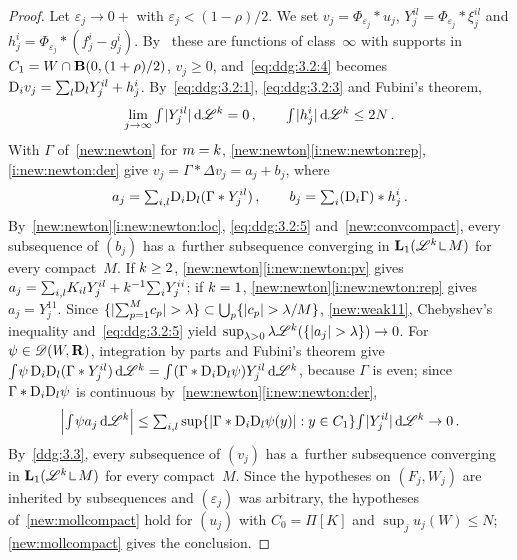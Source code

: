 \documentclass[a4paper,twoside,leqno]{article}
\begin{document}
\begin{proof}
    Let $\varepsilon_j \to 0+$ with $\varepsilon_j < (1 - \rho)/2$. We set $v_j =
    \Phi_{\varepsilon_j} * u_j$, $Y_j^{il} = \Phi_{\varepsilon_j} * \xi_j^{il}$ and $h_j^i =
    \Phi_{\varepsilon_j} * (f_j^i - g_j^i)$. By~\cite[4.1.2, 4.1.5]{Federer1969} these are
    functions of class~$\infty$ with supports in $C_1 = W \cap \mathbf{B}(0,(1+\rho)/2)$, $v_j \ge 0$,
    and~\eqref{eq:ddg:3.2:4} becomes $\mathrm{D}_i v_j = {\textstyle\sum_{l}^{}} \mathrm{D}_l Y_j^{il} + h_j^i$.
    By~\eqref{eq:ddg:3.2:1}, \eqref{eq:ddg:3.2:3} and Fubini's theorem,
    \begin{equation}
        \label{eq:ddg:3.2:5}
        \lim_{j \to \infty} {\textstyle\int_{}^{}} |Y_j^{il}| \,\mathrm{d} \mathscr{L}^{k} = 0 \,, \qquad {\textstyle\int_{}^{}}
        |h_j^i| \,\mathrm{d} \mathscr{L}^{k} \le 2N \,.
    \end{equation}
    With $\Gamma$ of~\ref{new:newton} for $m = k$, \ref{new:newton}\ref{i:new:newton:rep},
    \ref{i:new:newton:der} give $v_j = \Gamma * \Delta v_j = a_j + b_j$, where
    \begin{displaymath}
        a_j = {\textstyle\sum_{i,l}^{}} \mathrm{D}_i \mathrm{D}_l (\Gamma * Y_j^{il}) \,, \qquad b_j = {\textstyle\sum_{i}^{}}
        (\mathrm{D}_i \Gamma) * h_j^i \,.
    \end{displaymath}
    By~\ref{new:newton}\ref{i:new:newton:loc}, \eqref{eq:ddg:3.2:5} and~\ref{new:convcompact},
    every subsequence of $(b_j)$ has a~further subsequence converging in $\Lp{1}(\LM^{\vdim}
    \restrict M)$ for every compact~$M$. If $k \ge 2$, \ref{new:newton}\ref{i:new:newton:pv}
    gives $a_j = {\textstyle\sum_{i,l}^{}} K_{il} Y_j^{il} + k^{-1} {\textstyle\sum_{i}^{}} Y_j^{ii}$; if $k =
    1$, \ref{new:newton}\ref{i:new:newton:rep} gives $a_j = Y_j^{11}$. Since $\{ |{\textstyle\sum_{p=1}^{M}}
    c_p| > \lambda \} \subset \bigcup_p \{ |c_p| > \lambda/M \}$, \ref{new:weak11},
    Chebyshev's inequality and~\eqref{eq:ddg:3.2:5} yield $\sup_{\lambda > 0} \lambda
    \mathscr{L}^{k}(\{ |a_j| > \lambda \}) \to 0$. For $\psi \in \mathscr{D}(W,\mathbf{R})$, integration by
    parts and Fubini's theorem give ${\textstyle\int_{}^{}} \psi \, \mathrm{D}_i \mathrm{D}_l (\Gamma * Y_j^{il}) \,\mathrm{d}
    \mathscr{L}^{k} = {\textstyle\int_{}^{}} (\Gamma * \mathrm{D}_i \mathrm{D}_l \psi) Y_j^{il} \,\mathrm{d} \mathscr{L}^{k}$, because
    $\Gamma$ is even; since $\Gamma * \mathrm{D}_i \mathrm{D}_l \psi$ is continuous
    by~\ref{new:newton}\ref{i:new:newton:der},
    \begin{displaymath}
        \Bigl| {\textstyle\int_{}^{}} \psi a_j \,\mathrm{d} \mathscr{L}^{k} \Bigr| \le {\textstyle\sum_{i,l}^{}} \sup \{ |\Gamma *
        \mathrm{D}_i \mathrm{D}_l \psi(y)| : y \in C_1 \} {\textstyle\int_{}^{}} |Y_j^{il}| \,\mathrm{d} \mathscr{L}^{k} \to 0 \,.
    \end{displaymath}
    By~\ref{ddg:3.3}, every subsequence of $(v_j)$ has a~further subsequence converging in
    $\Lp{1}(\LM^{\vdim} \restrict M)$ for every compact~$M$. Since the hypotheses on $(F_j, W_j)$
    are inherited by subsequences and $(\varepsilon_j)$ was arbitrary, the hypotheses
    of~\ref{new:mollcompact} hold for $(u_j)$ with $C_0 = \Pi[K]$ and $\sup_j u_j(W) \le N$;
    \ref{new:mollcompact} gives the conclusion.
\end{proof}
\end{document}

